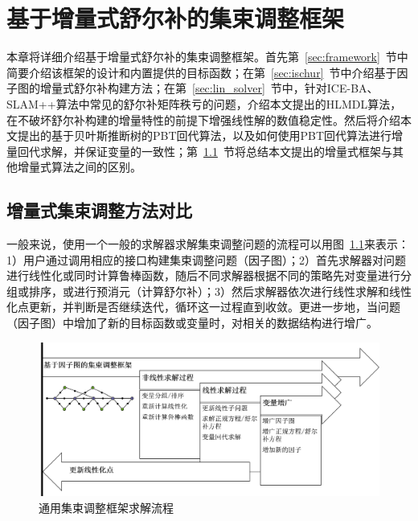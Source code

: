 \chapter{基于增量式舒尔补的集束调整框架}\label{ch:ba}

本章将详细介绍基于增量式舒尔补的集束调整框架。首先第~\ref{sec:framework}~节中简要介绍该框架的设计和内置提供的目标函数；在第~\ref{sec:ischur}~节中介绍基于因子图的增量式舒尔补构建方法；在第~\ref{sec:lin_solver}~节中，针对ICE-BA、SLAM++算法中常见的舒尔补矩阵秩亏的问题，介绍本文提出的HLMDL算法，在不破坏舒尔补构建的增量特性的前提下增强线性解的数值稳定性。然后将介绍本文提出的基于贝叶斯推断树的PBT回代算法，以及如何使用PBT回代算法进行增量回代求解，并保证变量的一致性；第~\ref{sec:comp}~节将总结本文提出的增量式框架与其他增量式算法之间的区别。







\section{增量式集束调整方法对比}\label{sec:comp}

一般来说，使用一个一般的求解器求解集束调整问题的流程可以用图~\ref{fig:pipeline}来表示：1）用户通过调用相应的接口构建集束调整问题（因子图）；2）首先求解器对问题进行线性化或同时计算鲁棒函数，随后不同求解器根据不同的策略先对变量进行分组或排序，或进行预消元（计算舒尔补）；3）然后求解器依次进行线性求解和线性化点更新，并判断是否继续迭代，循环这一过程直到收敛。更进一步地，当问题（因子图）中增加了新的目标函数或变量时，对相关的数据结构进行增广。

\begin{figure}[htb!]
    \centering
    \includegraphics[scale=.5]{Pictures/framework.png}
    \caption{通用集束调整框架求解流程}
    \label{fig:pipeline}
\end{figure}

